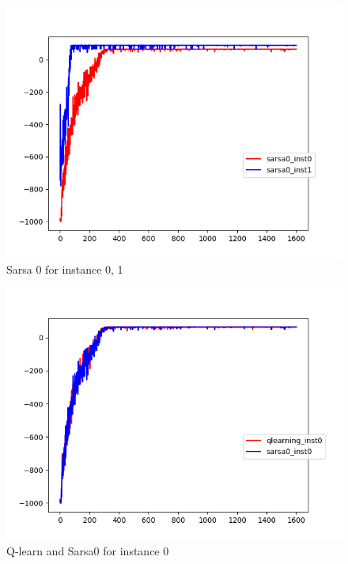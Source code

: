 \documentclass{article}
\begin{document}
\begin{figure}[H]
  \centering
  \includegraphics[scale=0.5]{images/sarsa0_instance_0_1}
  \caption{Sarsa 0 for instance 0, 1}
  \label{fig:s0i01}
\end{figure}

\begin{figure}[H]
  \centering
  \includegraphics[scale=0.5]{images/qlearn_sarsa0_instance0}
  \caption{Q-learn and Sarsa0 for instance 0}
  \label{fig:ins0}
\end{figure}
\end{document}
